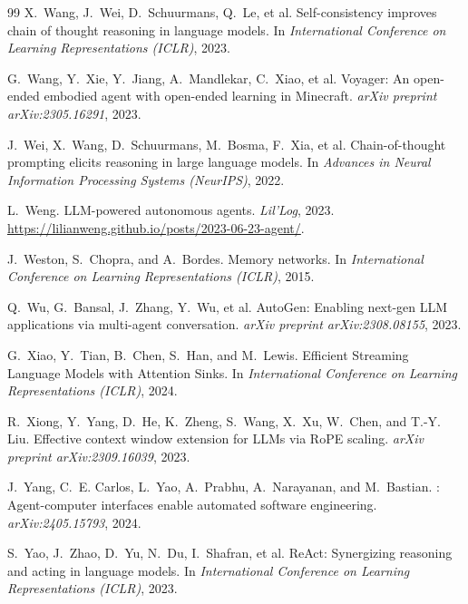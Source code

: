 \documentclass[conference]{IEEEtran}
\begin{document}
\begin{thebibliography}{99}
X.~Wang, J.~Wei, D.~Schuurmans, Q.~Le, et al.
\newblock Self-consistency improves chain of thought reasoning in language models.
\newblock In \emph{International Conference on Learning Representations (ICLR)}, 2023.

G.~Wang, Y.~Xie, Y.~Jiang, A.~Mandlekar, C.~Xiao, et al.
\newblock Voyager: An open-ended embodied agent with open-ended learning in Minecraft.
\newblock \emph{arXiv preprint arXiv:2305.16291}, 2023.

J.~Wei, X.~Wang, D.~Schuurmans, M.~Bosma, F.~Xia, et al.
\newblock Chain-of-thought prompting elicits reasoning in large language models.
\newblock In \emph{Advances in Neural Information Processing Systems (NeurIPS)}, 2022.

L.~Weng.
\newblock LLM-powered autonomous agents.
\newblock \emph{Lil'Log}, 2023. \url{https://lilianweng.github.io/posts/2023-06-23-agent/}.

J.~Weston, S.~Chopra, and A.~Bordes.
\newblock Memory networks.
\newblock In \emph{International Conference on Learning Representations (ICLR)}, 2015.

Q.~Wu, G.~Bansal, J.~Zhang, Y.~Wu, et al.
\newblock AutoGen: Enabling next-gen LLM applications via multi-agent conversation.
\newblock \emph{arXiv preprint arXiv:2308.08155}, 2023.

G.~Xiao, Y.~Tian, B.~Chen, S.~Han, and M.~Lewis.
\newblock Efficient Streaming Language Models with Attention Sinks.
\newblock In \emph{International Conference on Learning Representations (ICLR)}, 2024.

R.~Xiong, Y.~Yang, D.~He, K.~Zheng, S.~Wang, X.~Xu, W.~Chen, and T.-Y. Liu.
\newblock Effective context window extension for LLMs via RoPE scaling.
\newblock \emph{arXiv preprint arXiv:2309.16039}, 2023.

J.~Yang, C.~E. Carlos, L.~Yao, A.~Prabhu, A.~Narayanan, and M.~Bastian.
: Agent-computer interfaces enable automated software engineering.
\newblock \emph{arXiv:2405.15793}, 2024.

S.~Yao, J.~Zhao, D.~Yu, N.~Du, I.~Shafran, et al.
\newblock ReAct: Synergizing reasoning and acting in language models.
\newblock In \emph{International Conference on Learning Representations (ICLR)}, 2023.


\end{thebibliography}
\end{document}
